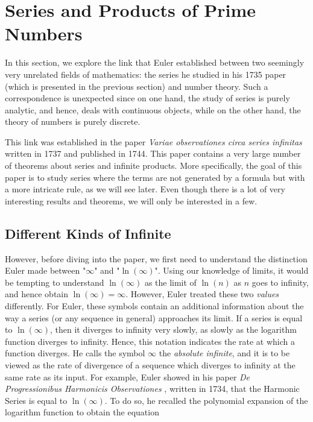 \section{Series and Products of Prime Numbers} \label{sec: prime numbers}

In this section, we explore the link that Euler established between two seemingly very unrelated fields of mathematics: the series he studied in his 1735 paper (which is presented in the previous section) and number theory. Such a correspondence is unexpected since on one hand, the study of series is purely analytic, and hence, deals with continuous objects, while on the other hand, the theory of numbers is purely discrete.

This link was established in the paper \textit{Variae observationes circa series infinitas} \cite{euler1737variae} written in 1737 and published in 1744. This paper contains a very large number of theorems about series and infinite products. More specifically, the goal of this paper is to study series where the terms are not generated by a formula but with a more intricate rule, as we will see later. Even though there is a lot of very interesting results and theorems, we will only be interested in a few.

\subsection*{Different Kinds of Infinite}

However, before diving into the paper, we first need to understand the distinction Euler made between "$\infty$" and "$\ln(\infty)$". Using our knowledge of limits, it would be tempting to understand $\ln(\infty)$ as the limit of $\ln(n)$ as $n$ goes to infinity, and hence obtain $\ln(\infty) = \infty$. However, Euler treated these two \textit{values} differently. For Euler, these symbols contain an additional information about the way a series (or any sequence in general) approaches its limit. If a series is equal to $\ln(\infty)$, then it diverges to infinity very slowly, as slowly as the logarithm function diverges to infinity. Hence, this notation indicates the rate at which a function diverges. He calls the symbol $\infty$ the \textit{absolute infinite}, and it is to be viewed as the rate of divergence of a sequence which diverges to infinity at the same rate as its input. For example, Euler showed in his paper \textit{De Progressionibus Harmonicis Observationes} \cite{euler1740progressionibus}, written in 1734, that the Harmonic Series is equal to $\ln(\infty)$. To do so, he recalled the polynomial expansion of the logarithm function to obtain the equation

